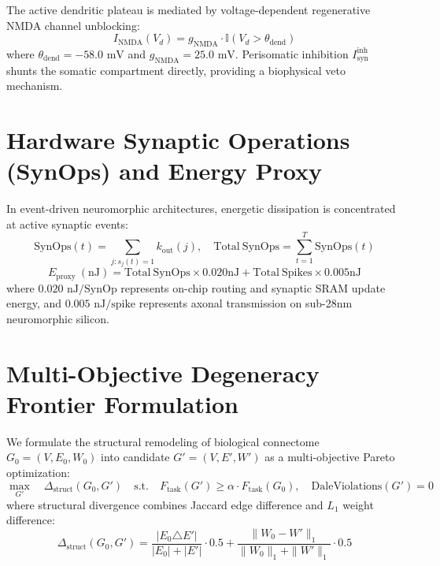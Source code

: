 \documentclass[11pt,letterpaper]{report}
\begin{document}
The active dendritic plateau is mediated by voltage-dependent regenerative NMDA channel unblocking:
\begin{equation}
I_{\mathrm{NMDA}}(V_d) = g_{\mathrm{NMDA}} \cdot \mathbb{I}(V_d > \theta_{\mathrm{dend}})
\end{equation}
where $\theta_{\mathrm{dend}} = -58.0\text{ mV}$ and $g_{\mathrm{NMDA}} = 25.0\text{ mV}$. Perisomatic inhibition $I_{\mathrm{syn}}^{\mathrm{inh}}$ shunts the somatic compartment directly, providing a biophysical veto mechanism.

\section{Hardware Synaptic Operations (SynOps) and Energy Proxy}
In event-driven neuromorphic architectures, energetic dissipation is concentrated at active synaptic events:
\begin{equation}
\mathrm{SynOps}(t) = \sum_{j: s_j(t)=1} k_{\mathrm{out}}(j), \quad \mathrm{Total\ SynOps} = \sum_{t=1}^T \mathrm{SynOps}(t)
\end{equation}
\begin{equation}
E_{\mathrm{proxy}}\ (\mathrm{nJ}) = \mathrm{Total\ SynOps} \times 0.020\mathrm{ nJ} + \mathrm{Total\ Spikes} \times 0.005\mathrm{ nJ}
\end{equation}
where $0.020\text{ nJ/SynOp}$ represents on-chip routing and synaptic SRAM update energy, and $0.005\text{ nJ/spike}$ represents axonal transmission on sub-28nm neuromorphic silicon.

\section{Multi-Objective Degeneracy Frontier Formulation}
We formulate the structural remodeling of biological connectome $G_0 = (V, E_0, W_0)$ into candidate $G' = (V, E', W')$ as a multi-objective Pareto optimization:
\begin{equation}
\max_{G'} \quad \Delta_{\mathrm{struct}}(G_0, G') \quad \text{s.t.} \quad F_{\mathrm{task}}(G') \ge \alpha \cdot F_{\mathrm{task}}(G_0), \quad \mathrm{DaleViolations}(G') = 0
\end{equation}
where structural divergence combines Jaccard edge difference and $L_1$ weight difference:
\begin{equation}
\Delta_{\mathrm{struct}}(G_0, G') = \frac{|E_0 \triangle E'|}{|E_0| + |E'|} \cdot 0.5 + \frac{\|W_0 - W'\|_1}{\|W_0\|_1 + \|W'\|_1} \cdot 0.5
\end{equation}
\end{document}
